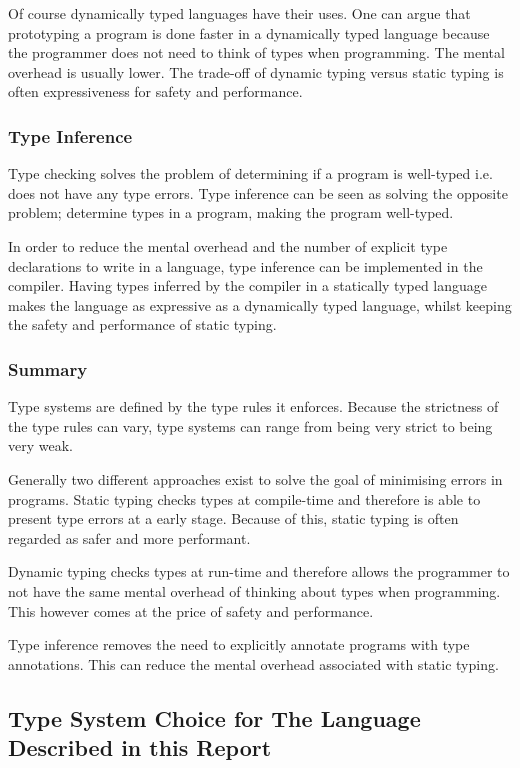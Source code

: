 Of course dynamically typed languages have their uses. One can argue that prototyping a program is done faster in a dynamically typed language because the programmer does not need to think of types when programming. The mental overhead is usually lower. The trade-off of dynamic typing versus static typing is often expressiveness for safety and performance.

\subsubsection{Type Inference}
Type checking solves the problem of determining if a program is well-typed i.e. does not have any type errors. Type inference can be seen as solving the opposite problem; determine types in a program, making the program well-typed.

In order to reduce the mental overhead and the number of explicit type declarations to write in a language, type inference can be implemented in the compiler. Having types inferred by the compiler in a statically typed language makes the language as expressive as a dynamically typed language, whilst keeping the safety and performance of static typing.

\subsubsection{Summary}
Type systems are defined by the type rules it enforces. Because the strictness of the type rules can vary, type systems can range from being very strict to being very weak.

Generally two different approaches exist to solve the goal of minimising errors in programs. Static typing checks types at compile-time and therefore is able to present type errors at a early stage. Because of this, static typing is often regarded as safer and more performant.

Dynamic typing checks types at run-time and therefore allows the programmer to not have the same mental overhead of thinking about types when programming. This however comes at the price of safety and performance.

Type inference removes the need to explicitly annotate programs with type annotations. This can reduce the mental overhead associated with static typing.

\subsection{Type System Choice for The Language Described in this Report}

